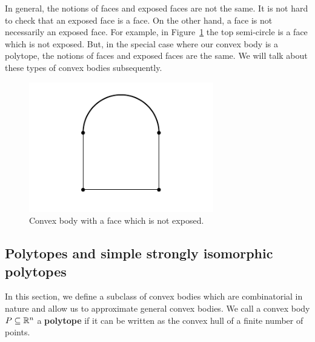 \documentclass{puthesis-UG}
\begin{document}
\begin{remark}
	In general, the notions of faces and exposed faces are not the same. It is not hard to check that an exposed face is a face. On the other hand, a face is not necessarily an exposed face. For example, in Figure~\ref{counter-example} the top semi-circle is a face which is not exposed. But, in the special case where our convex body is a polytope, the notions of faces and exposed faces are the same. We will talk about these types of convex bodies subsequently. 
	
	\begin{figure}[h] \label{counter-example}
		\begin{center}
			\includegraphics[scale = 1]{image5.PNG}
			\caption{Convex body with a face which is not exposed.}
		\end{center}
	\end{figure}
	
\end{remark}

\subsection{Polytopes and simple strongly isomorphic polytopes }

In this section, we define a subclass of convex bodies which are combinatorial in nature and allow us to approximate general convex bodies. We call a convex body $P \subseteq \mathbb{R}^n$ a \textbf{polytope} if it can be written as the convex hull of a finite number of points. 
\end{document}
